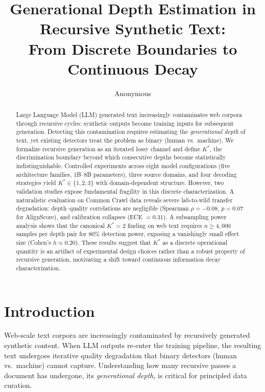\documentclass[11pt,a4paper]{article}
\title{Generational Depth Estimation in Recursive Synthetic Text:\\From Discrete Boundaries to Continuous Decay}
\author{Anonymous}
\date{}
\begin{document}
\maketitle

\begin{abstract}
Large Language Model (LLM) generated text increasingly contaminates web corpora through recursive cycles: synthetic outputs become training inputs for subsequent generation.
Detecting this contamination requires estimating the \emph{generational depth} of text, yet existing detectors treat the problem as binary (human vs.\ machine).
We formalize recursive generation as an iterated lossy channel and define $K^*$, the discrimination boundary beyond which consecutive depths become statistically indistinguishable.
Controlled experiments across eight model configurations (five architecture families, 1B--8B parameters), three source domains, and four decoding strategies yield $K^* \in \{1,2,3\}$ with domain-dependent structure.
However, two validation studies expose fundamental fragility in this discrete characterization.
A naturalistic evaluation on Common Crawl data reveals severe lab-to-wild transfer degradation: depth--quality correlations are negligible (Spearman $\rho = -0.08$, $p = 0.07$ for AlignScore), and calibration collapses (ECE $= 0.31$).
A subsampling power analysis shows that the canonical $K^* = 2$ finding on web text requires $n \geq 4{,}000$ samples per depth pair for 80\% detection power, exposing a vanishingly small effect size (Cohen's $h \approx 0.20$).
These results suggest that $K^*$ as a discrete operational quantity is an artifact of experimental design choices rather than a robust property of recursive generation, motivating a shift toward continuous information decay characterization.
\end{abstract}

\section{Introduction}

Web-scale text corpora are increasingly contaminated by recursively generated synthetic content.
When LLM outputs re-enter the training pipeline, the resulting text undergoes iterative quality degradation that binary detectors (human vs.\ machine) cannot capture.
Understanding how many recursive passes a document has undergone, its \emph{generational depth}, is critical for principled data curation.
\end{document}
